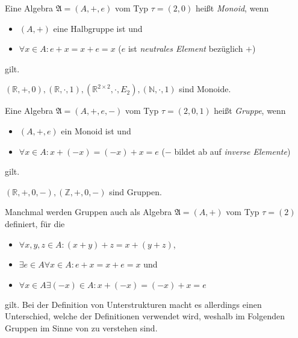 \begin{definition}\label{def:monoid}
    Eine Algebra $\mathfrak{A} = (A, +, e)$ vom Typ $\tau = (2,0)$ heißt \emph{Monoid}, wenn
    \begin{itemize}
        \item $(A, +)$ eine Halbgruppe ist und
        \item $\forall x \in A: e + x = x + e = x$ \tab ($e$ ist \emph{neutrales Element} bezüglich $+$)
    \end{itemize}
    gilt.
\end{definition}

\begin{example}
    $(\mathbb{R}, +, 0), (\mathbb{R}, \cdot, 1), (\mathbb{R}^{2\times 2}, \cdot, E_2), (\mathbb{N}, \cdot, 1)$ sind Monoide.
\end{example}

\begin{definition}\label{def:gruppe}
    Eine Algebra $\mathfrak{A} = (A, +, e, -)$ vom Typ $\tau = (2,0,1)$ heißt \emph{Gruppe}, wenn
    \begin{itemize}
        \item $(A, +, e)$ ein Monoid ist und
        \item $\forall x \in A: x + (-x) = (-x) + x = e$ \tab ($-$ bildet ab auf \emph{inverse Elemente})
    \end{itemize}
    gilt.
\end{definition}

\begin{example}
    $(\mathbb{R},+, 0, -), (\mathbb{Z}, +, 0, -)$ sind Gruppen.
\end{example}

\begin{remark}\label{rem:alternativegruppe}
    Manchmal werden Gruppen auch als Algebra $\mathfrak{A} = (A, +)$ vom Typ $\tau = (2)$ definiert, für die
    \begin{itemize}
        \item $\forall x,y,z \in A: (x + y) + z = x + (y + z)$,
        \item $\exists e \in A \forall x \in A: e + x = x + e = x$ und 
        \item $\forall x \in A \exists (-x) \in A: x + (-x) = (-x) + x = e$
    \end{itemize}
    gilt.
    Bei der Definition von Unterstrukturen macht es allerdings einen Unterschied, welche der Definitionen verwendet wird, weshalb im Folgenden Gruppen im Sinne von  zu verstehen sind.
\end{remark}

